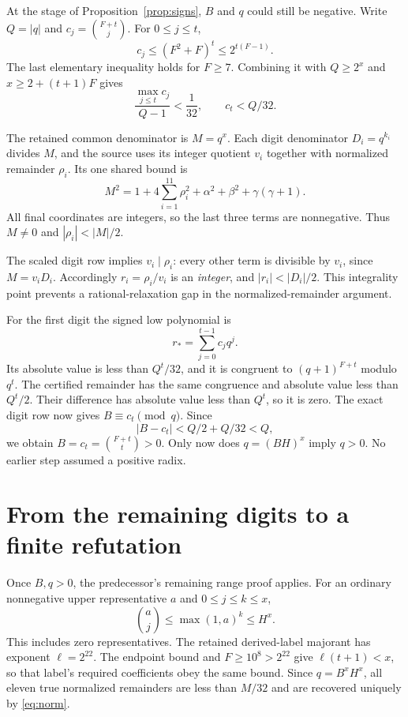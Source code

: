 \documentclass[11pt]{article}
\theoremstyle{remark}\newtheorem{remark}[theorem]{Remark}
\begin{document}
At the stage of Proposition~\ref{prop:signs}, $B$ and $q$ could still
be negative. Write $Q=|q|$ and
$c_j=\binom{F+t}{j}$. For $0\le j\le t$,
\[
 c_j\le(F^2+F)^t\le2^{t(F-1)}.
\]
The last elementary inequality holds for $F\ge7$. Combining it with
$Q\ge2^x$ and $x\ge2+(t+1)F$ gives
\[
       \frac{\max_{j\le t}c_j}{Q-1}<\frac1{32},
       \qquad c_t<Q/32.
\]

The retained common denominator is $M=q^x$. Each digit denominator
$D_i=q^{k_i}$ divides $M$, and the source uses its integer quotient
$v_i$ together with normalized remainder $\rho_i$. Its one shared bound is
\begin{equation}\label{eq:norm}
 M^2=1+4\sum_{i=1}^{11}\rho_i^2
          +\alpha^2+\beta^2+\gamma(\gamma+1).
\end{equation}
All final coordinates are integers, so the last three terms are
nonnegative. Thus $M\ne0$ and $|\rho_i|<|M|/2$.

The scaled digit row implies $v_i\mid\rho_i$: every other term is
divisible by $v_i$, since $M=v_iD_i$. Accordingly
$r_i=\rho_i/v_i$ is an \emph{integer}, and
$|r_i|<|D_i|/2$. This integrality point prevents a rational-relaxation
gap in the normalized-remainder argument.

For the first digit the signed low polynomial is
\[
                    r_* =\sum_{j=0}^{t-1}c_jq^j.
\]
Its absolute value is less than $Q^t/32$, and it is congruent to
$(q+1)^{F+t}$ modulo $q^t$. The certified remainder has the same
congruence and absolute value less than $Q^t/2$. Their difference has
absolute value less than $Q^t$, so it is zero. The exact digit row now
gives $B\equiv c_t\pmod q$. Since
\[
             |B-c_t|<Q/2+Q/32<Q,
\]
we obtain $B=c_t=\binom{F+t}{t}>0$. Only now does
$q=(BH)^x$ imply $q>0$. No earlier step assumed a positive radix.

\section{From the remaining digits to a finite refutation}

Once $B,q>0$, the predecessor's remaining range proof applies. For an
ordinary nonnegative upper representative $a$ and $0\le j\le k\le x$,
\[
             \binom aj\le\max(1,a)^k\le H^x.
\]
This includes zero representatives. The retained derived-label
majorant has exponent $\ell=2^{22}$. The endpoint bound and $F\ge10^8>2^{22}$
give $\ell(t+1)<x$, so that label's required coefficients obey the same
bound. Since $q=B^xH^x$, all eleven true normalized remainders are
less than $M/32$ and are recovered uniquely by \eqref{eq:norm}.
\end{document}
